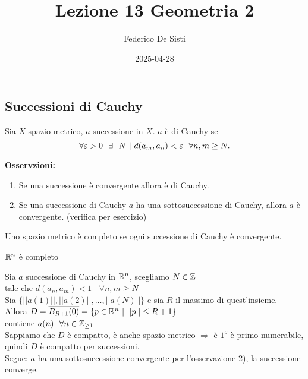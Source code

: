 \documentclass[12px]{article}
\title{Lezione 13 Geometria 2}
\date{2025-04-28}
\author{Federico De Sisti}
\begin{document}
	\maketitle
	\newpage
	\subsection{Successioni di Cauchy}
	\begin{defi}
		Sia $X$ spazio metrico, $a$ successione in $X$. $a$ è di Cauchy se 
		\[
		\forall \e > 0\ \  \exists \ \ N \ | \ d(a_m,a_n) < \e \ \ \forall n,m\geq N
		.\] 
	\end{defi}
	\textbf{Osservzioni:}
	\begin{enumerate}
		\item Se una successione è convergente allora è di Cauchy.
		\item Se una successione di Cauchy $a$ ha una sottosuccessione di Cauchy, allora $a$ è convergente. (verifica per esercizio)
	\end{enumerate}
	\begin{defi}
		Uno spazio metrico è completo se ogni successione di Cauchy è convergente.
	\end{defi}
	\begin{teo}
		$\mathbb{R}^n$ è completo
	\end{teo}
	\begin{dimo}
		Sia $a$ successione di Cauchy in $\mathbb{R}^n$, scegliamo  $N\in \mathbb{Z}$\\ tale che  $d(a_n,a_m) < 1\ \ \ \ \forall n,m\geq N$ \\
		Sia $\{||a(1)||, ||a(2)||,\ldots, ||a(N)||\}$ e sia $R$ il massimo di quest'insieme.\\
		Allora $D = \overline {B_{R + 1}(0)} = \{p\in\mathbb{R}^n\ | \ ||p|| \leq R + 1\}$\\
		contiene  $a(n) \ \ \forall n\in\mathbb{Z}_{\geq 1}$\\
		Sappiamo che  $D$ è compatto, è anche spazio metrico $ \Rightarrow$  è $1^o$ è primo numerabile, quindi $D$ è compatto per successioni.\\
		Segue: $a$ ha una sottosuccessione convergente per l'osservazione 2), la successione converge.
	\end{dimo}
\end{document}
